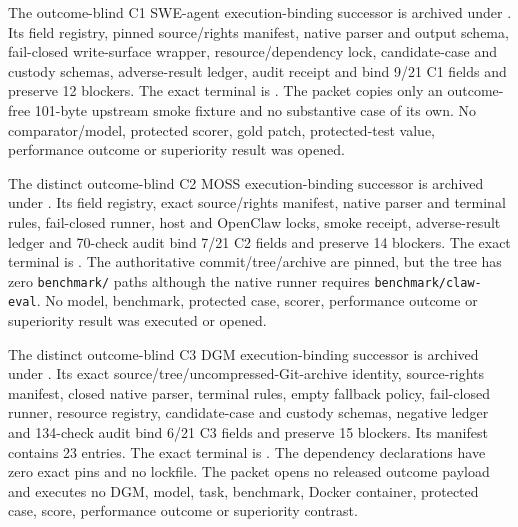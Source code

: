 The outcome-blind C1 SWE-agent execution-binding successor is archived under
. Its field
registry, pinned source/rights manifest, native parser and output schema,
fail-closed write-surface wrapper, resource/dependency lock, candidate-case and
custody schemas, adverse-result ledger, audit receipt and 
bind 9/21 C1 fields and preserve 12 blockers. The exact terminal is
.
The packet copies only an outcome-free 101-byte upstream smoke fixture and no
substantive case of its own. No comparator/model, protected scorer, gold patch,
protected-test value, performance outcome or superiority result was opened.

The distinct outcome-blind C2 MOSS execution-binding successor is archived
under . Its field
registry, exact source/rights manifest, native parser and terminal rules,
fail-closed runner, host and OpenClaw locks, smoke receipt, adverse-result
ledger and 70-check audit bind 7/21 C2 fields and preserve 14 blockers. The
exact terminal is
.
The authoritative commit/tree/archive are pinned, but the tree has zero
\texttt{benchmark/} paths although the native runner requires
\texttt{benchmark/claw-eval}. No model, benchmark, protected case, scorer,
performance outcome or superiority result was executed or opened.

The distinct outcome-blind C3 DGM execution-binding successor is archived
under . Its exact
source/tree/uncompressed-Git-archive identity, source-rights manifest, closed
native parser, terminal rules, empty fallback policy, fail-closed runner,
resource registry, candidate-case and custody schemas, negative ledger and
134-check audit bind 6/21 C3 fields and preserve 15 blockers. Its manifest
contains 23 entries. The exact terminal is
.
The dependency declarations have zero exact pins and no lockfile. The packet
opens no released outcome payload and executes no DGM, model, task, benchmark,
Docker container, protected case, score, performance outcome or superiority
contrast.


